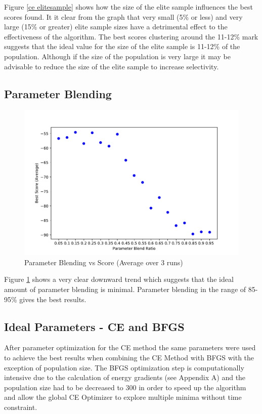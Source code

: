 \documentclass[conference,letterpaper]{IEEEtran}
\begin{document}
\par Figure \ref{ce elitesample} shows how the size of the elite sample influences the best scores found. It it clear from the graph that very small (5\% or less) and very large (15\% or greater) elite sample sizes have a detrimental effect to the effectiveness of the algorithm. The best scores clustering around the 11-12\% mark suggests that the ideal value for the size of the elite sample is 11-12\% of the population. Although if the size of the population is very large it may be advisable to reduce the size of the elite sample to increase selectivity. 

\subsection{Parameter Blending}
\begin{figure}[H]
    \includegraphics[scale=0.43]{CE_blending}
    \caption{Parameter Blending vs Score (Average over 3 runs)}
    \label{ce blending}
\end{figure}
\par Figure \ref{ce blending} shows a very clear downward trend which suggests that the ideal amount of parameter blending is minimal. Parameter blending in the range of 85-95\% gives the best results.

\subsection{Ideal Parameters - CE and BFGS}
\par After parameter optimization for the CE method the same parameters were used to achieve the best results when combining the CE Method with BFGS with the exception of population size. The BFGS optimization step is computationally intensive due to the calculation of energy gradients (see Appendix A) and the population size had to be decreased to 300 in order to speed up the algorithm and allow the global CE Optimizer to explore multiple minima without time constraint.
\end{document}
